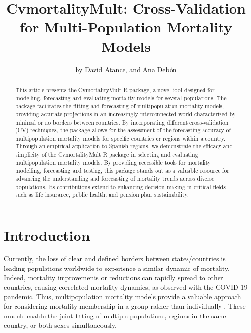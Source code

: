 \title{CvmortalityMult: Cross-Validation for Multi-Population Mortality Models}
\author{by David Atance, and Ana Debón}

\maketitle

\begin{abstract}
This article presents the CvmortalityMult R package, a novel tool designed for modelling, forecasting and evaluating mortality models for several populations. The package facilitates the fitting and forecasting of multipopulation mortality models, providing accurate projections in an increasingly interconnected world characterized by minimal or no borders between countries. By incorporating different cross-validation (CV) techniques, the package allows for the assessment of the forecasting accuracy of multipopulation mortality models for specific countries or regions within a country. Through an empirical application to Spanish regions, we demonstrate the efficacy and simplicity of the CvmortalityMult R package in selecting and evaluating multipopulation mortality models. By providing accessible tools for mortality modelling, forecasting and testing, this package stands out as a valuable resource for advancing the understanding and forecasting of mortality trends across diverse populations. Its contributions extend to enhancing decision-making in critical fields such as life insurance, public health, and pension plan sustainability.
\end{abstract}

\section{Introduction}\label{sec:intro}

\sloppy
Currently, the loss of clear and defined borders between states/countries is leading populations worldwide to experience a similar dynamic of mortality. Indeed, mortality improvements or reductions can rapidly spread to other countries, causing correlated mortality dynamics, as observed with the COVID-19 pandemic. Thus, multipopulation mortality models provide a valuable approach for considering mortality membership in a group rather than individually \citep{Li2005}. These models enable the joint fitting of multiple populations, regions in the same country, or both sexes simultaneously.

